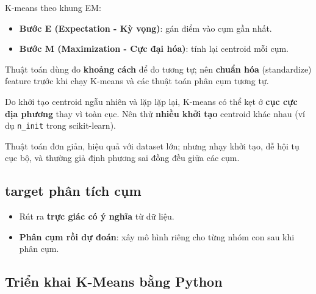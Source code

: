 \begin{dinhnghia}[title={Expectation--Maximization (EM)}]
K-means theo khung EM:
\begin{itemize}
  \item \textbf{Bước E (Expectation - Kỳ vọng)}: gán điểm vào cụm gần nhất.
  \item \textbf{Bước M (Maximization - Cực đại hóa)}: tính lại centroid mỗi cụm.
\end{itemize}
\end{dinhnghia}

\begin{luuy}[title={Chuẩn hóa dữ liệu}]
Thuật toán dùng đo \textbf{khoảng cách} để đo tương tự; nên \textbf{chuẩn hóa} (standardize) feature trước khi chạy K-means và các thuật toán phân cụm tương tự.
\end{luuy}

\begin{luuy}[title={Cục cực địa phương}]
Do khởi tạo centroid ngẫu nhiên và lặp lặp lại, K-means có thể kẹt ở \textbf{cục cực địa phương} thay vì toàn cục. Nên thử \textbf{nhiều khởi tạo} centroid khác nhau (ví dụ \texttt{n\_init} trong scikit-learn).
\end{luuy}

\begin{tinhchat}[title={Ưu/nhược điểm tổng quan}]
Thuật toán đơn giản, hiệu quả với dataset lớn; nhưng nhạy khởi tạo, dễ hội tụ cục bộ, và thường giả định phương sai đồng đều giữa các cụm.
\end{tinhchat}

\subsection{target phân tích cụm}

\begin{dongco}[title={Hai target chính}]
\begin{itemize}
  \item Rút ra \textbf{trực giác có ý nghĩa} từ dữ liệu.
  \item \textbf{Phân cụm rồi dự đoán}: xây mô hình riêng cho từng nhóm con sau khi phân cụm.
\end{itemize}
\end{dongco}

\subsection{Triển khai K-Means bằng Python}

